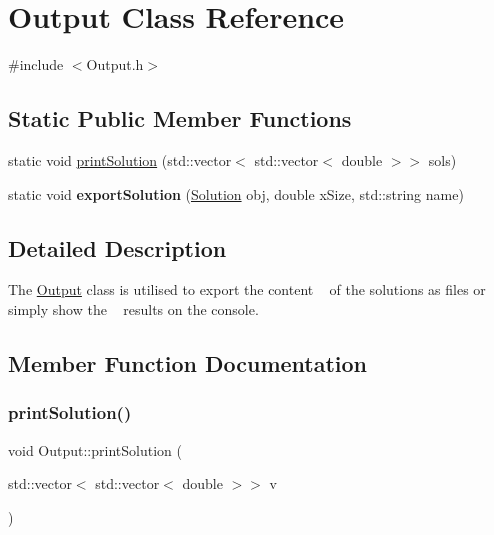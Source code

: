 \hypertarget{class_output}{}\section{Output Class Reference}
\label{class_output}


{\ttfamily \#include $<$Output.\+h$>$}

\subsection*{Static Public Member Functions}
\begin{DoxyCompactItemize}
\item 
static void \hyperlink{class_output_a79b3b86314e979457e5aac1ff4840605}{print\+Solution} (std\+::vector$<$ std\+::vector$<$ double $>$$>$ sols)
\item 
\mbox{\label{class_output_a0d39b68ef723d6372f7c17e967a1d29a}} 
static void {\bfseries export\+Solution} (\hyperlink{class_solution}{Solution} obj, double x\+Size, std\+::string name)
\end{DoxyCompactItemize}


\subsection{Detailed Description}
The \hyperlink{class_output}{Output} class is utilised to export the content ~\newline
 of the solutions as files or simply show the ~\newline
 results on the console. 

\subsection{Member Function Documentation}
\mbox{\label{class_output_a79b3b86314e979457e5aac1ff4840605}} 
\subsubsection{\texorpdfstring{print\+Solution()}{printSolution()}}
{\footnotesize\ttfamily void Output\+::print\+Solution (\begin{DoxyParamCaption}\item[{std\+::vector$<$ std\+::vector$<$ double $>$$>$}]{v }\end{DoxyParamCaption})\hspace{0.3cm}{\ttfamily [static]}}

